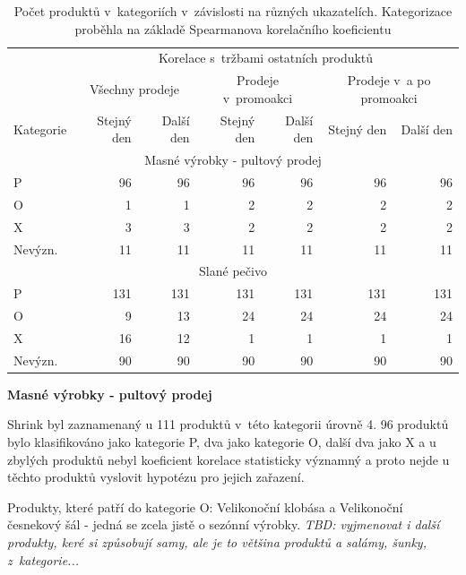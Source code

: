\begin{table}[hbtp!]
    \centering
    \captionsetup{justification=centering}
    \caption{Počet produktů v~kategoriích v~závislosti na různých ukazatelích. Kategorizace proběhla na základě Spearmanova korelačního koeficientu}
    \begin{tabular}{l *{6}{r}}
    \toprule
    \multicolumn{1}{l}{} & \multicolumn{6}{c}{Korelace s~tržbami ostatních produktů} \\
    \multicolumn{1}{l}{} & \multicolumn{2}{c}{Všechny prodeje} & \multicolumn{2}{c}{Prodeje v~promoakci}  & \multicolumn{2}{c}{Prodeje v~a po promoakci} \\
    Kategorie & Stejný den & Další den & Stejný den & Další den & Stejný den & Další den \\
    \midrule
    \multicolumn{7}{c}{Masné výrobky - pultový prodej} \\
    \midrule
    P           & 96   & 96   & 96   & 96   & 96   & 96   \\
    O           & 1     & 1   & 2   & 2   & 2   & 2   \\
    X           & 3     & 3   & 2   & 2   & 2   & 2   \\
    Nevýzn.     & 11    & 11   & 11   & 11   & 11   & 11   \\
    \midrule
    \multicolumn{7}{c}{Slané pečivo} \\
    \midrule
    P           & 131   & 131   & 131   & 131   & 131   & 131   \\
    O           & 9     & 13   & 24   & 24   & 24   & 24   \\
    X           & 16    & 12   & 1    & 1    & 1    & 1    \\
    Nevýzn.     & 90    & 90   & 90   & 90   & 90   & 90   \\
    \bottomrule

    \end{tabular}
    \label{tab:kategCorrPorovnani}
\end{table}



\textbf{Masné výrobky - pultový prodej}

Shrink byl zaznamenaný u 111 produktů v~této kategorii úrovně 4. 96 produktů bylo klasifikováno jako kategorie P, dva jako kategorie O, další dva jako X a u zbylých produktů nebyl koeficient korelace statisticky významný a proto nejde u těchto produktů vyslovit hypotézu pro jejich zařazení.

Produkty, které patří do kategorie O: Velikonoční klobása a Velikonoční česnekový šál - jedná se zcela jistě o sezónní výrobky. \emph{TBD: vyjmenovat i další produkty, keré si způsobují samy, ale je to většina produktů a salámy, šunky, z~kategorie...} 

